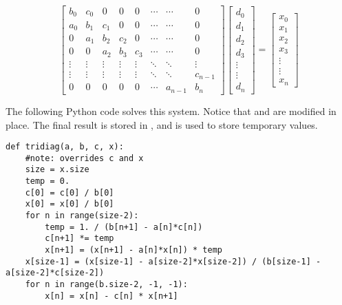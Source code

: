 \[
\begin{bmatrix}
b_0 & c_0 & 0 & 0 & 0 & \cdots & \cdots & 0 \\
a_0 & b_1 & c_1 & 0 & 0 & \cdots & \cdots & 0 \\
0 & a_1 & b_2 & c_2 & 0 & \cdots & \cdots & 0 \\
0 & 0 & a_2 & b_3 & c_3 & \cdots & \cdots & 0 \\
\vdots & \vdots & \vdots & \vdots & \vdots & \ddots & \ddots & \vdots \\
\vdots & \vdots & \vdots & \vdots & \vdots & \ddots & \ddots & c_{n-1} \\
0 & 0 & 0 & 0 & 0 & \cdots & a_{n-1} & b_n 
\end{bmatrix}
\begin{bmatrix}
d_0\\
d_1\\
d_2\\
d_3\\
\vdots\\
\vdots\\
d_n
\end{bmatrix}
=
\begin{bmatrix}
x_0\\
x_1\\
x_2\\
x_3\\
\vdots\\
\vdots\\
x_n
\end{bmatrix}
\]

The following Python code solves this system.
Notice that  and  are modified in place.
The final result is stored in , and  is used to store temporary values.

\begin{lstlisting}
def tridiag(a, b, c, x):
    #note: overrides c and x
    size = x.size
    temp = 0.
    c[0] = c[0] / b[0]
    x[0] = x[0] / b[0]
    for n in range(size-2):
        temp = 1. / (b[n+1] - a[n]*c[n])
        c[n+1] *= temp
        x[n+1] = (x[n+1] - a[n]*x[n]) * temp
    x[size-1] = (x[size-1] - a[size-2]*x[size-2]) / (b[size-1] - a[size-2]*c[size-2])
    for n in range(b.size-2, -1, -1):
        x[n] = x[n] - c[n] * x[n+1]
\end{lstlisting}

